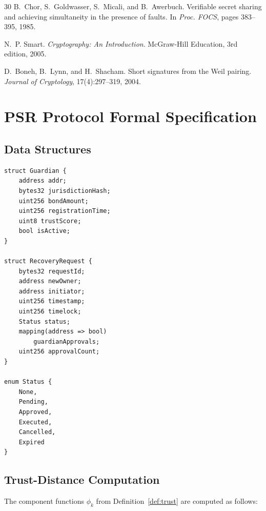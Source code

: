 \documentclass[11pt,a4paper,twocolumn]{article}
\begin{document}
\begin{thebibliography}{30}
B.~Chor, S.~Goldwasser, S.~Micali, and B.~Awerbuch.
\newblock Verifiable secret sharing and achieving simultaneity in the presence of faults.
\newblock In \emph{Proc. FOCS}, pages 383--395, 1985.

N.~P. Smart.
\newblock \emph{Cryptography: An Introduction}.
\newblock McGraw-Hill Education, 3rd edition, 2005.

D.~Boneh, B.~Lynn, and H.~Shacham.
\newblock Short signatures from the Weil pairing.
\newblock \emph{Journal of Cryptology}, 17(4):297--319, 2004.

\end{thebibliography}

\appendix

\section{PSR Protocol Formal Specification}\label{app:spec}

\subsection{Data Structures}

\begin{lstlisting}[style=solidity,caption={Core data structures},label={lst:structs}]
struct Guardian {
    address addr;
    bytes32 jurisdictionHash;
    uint256 bondAmount;
    uint256 registrationTime;
    uint8 trustScore;
    bool isActive;
}

struct RecoveryRequest {
    bytes32 requestId;
    address newOwner;
    address initiator;
    uint256 timestamp;
    uint256 timelock;
    Status status;
    mapping(address => bool)
        guardianApprovals;
    uint256 approvalCount;
}

enum Status {
    None,
    Pending,
    Approved,
    Executed,
    Cancelled,
    Expired
}
\end{lstlisting}

\subsection{Trust-Distance Computation}

The component functions $\phi_k$ from Definition~\ref{def:trust} are computed as follows:
\end{document}
